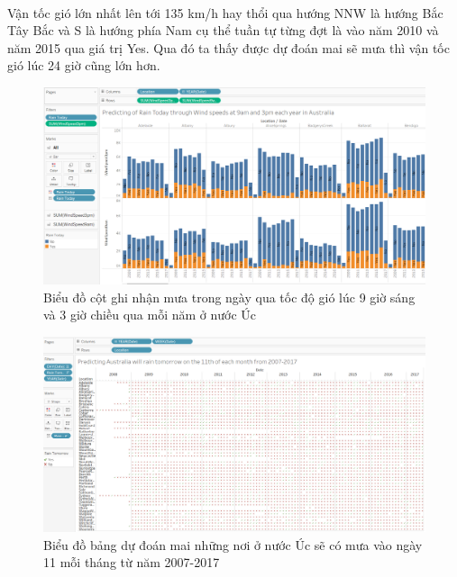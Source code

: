\documentclass{article}
\begin{document}
\paragraph{}Vận tốc gió lớn nhất lên tới 135 km/h hay thổi qua hướng NNW là hướng Bắc Tây Bắc và S là hướng phía Nam cụ thể tuần tự từng đợt là vào năm 2010 và năm 2015 qua giá trị Yes. Qua đó ta thấy được dự đoán mai sẽ mưa thì vận tốc gió lúc 24 giờ cũng lớn hơn.
\pagebreak{}
\begin{figure}[!h]
	\begin{center}
		\includegraphics[width=\linewidth]{images/tableau7.png}
		\caption{\fontsize{14}{20}\selectfont Biểu đồ cột ghi nhận mưa trong ngày qua tốc độ gió lúc 9 giờ sáng và 3 giờ chiều qua mỗi năm ở nước Úc}
	\end{center}
\end{figure}
\pagebreak{}
\begin{figure}[!h]
	\begin{center}
		\includegraphics[width=\linewidth]{images/tableau8.png}
		\caption{\fontsize{14}{20}\selectfont Biểu đồ bảng dự đoán mai những nơi ở nước Úc sẽ có mưa vào ngày 11 mỗi tháng từ năm 2007-2017}
	\end{center}
\end{figure}
\end{document}
